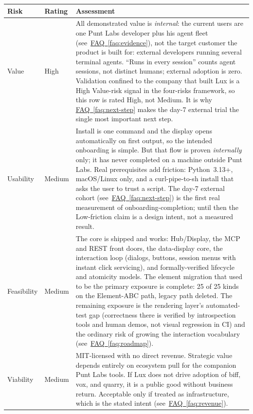 \documentclass[11pt,letterpaper]{article}
\newcommand{\faqref}[1]{\hyperref[#1]{FAQ~\ref*{#1}}}
\begin{document}
\renewcommand{\arraystretch}{1.6}
\begin{tabularx}{\textwidth}{@{} l l X @{}}
\toprule
\textbf{\color{SectionBlue}Risk} & \textbf{\color{SectionBlue}Rating} & \textbf{\color{SectionBlue}Assessment} \\
\midrule
Value      & \textcolor{RiskRed}{High} &
  All demonstrated value is \emph{internal}: the current users are one Punt Labs
  developer plus his agent fleet (see~\faqref{faq:evidence}), not the target
  customer the product is built for: external developers running several
  terminal agents. ``Runs in every session'' counts agent sessions, not distinct
  humans; external adoption is zero. Validation confined to the company that
  built Lux is a High Value-risk signal in the four-risks framework, so this row
  is rated High, not Medium. It is why \faqref{faq:next-step} makes the day-7
  external trial the single most important next step. \\
Usability  & \textcolor{RiskAmber}{Medium} &
  Install is one command and the display opens automatically on first output, so
  the intended onboarding is simple. But that flow is proven \emph{internally}
  only; it has never completed on a machine outside Punt Labs. Real prerequisites
  add friction: Python~3.13+, macOS/Linux only, and a curl-pipe-to-sh install
  that asks the user to trust a script. The day-7 external cohort
  (see~\faqref{faq:next-step}) is the first real measurement of
  onboarding-completion; until then the Low-friction claim is a design intent,
  not a measured result. \\
Feasibility & \textcolor{RiskAmber}{Medium} &
  The core is shipped and works: Hub/Display, the MCP and REST front doors, the
  data-display core, the interaction loop (dialogs, buttons, session menus with
  instant click servicing), and formally-verified lifecycle and atomicity
  models. The element migration that used to be the primary exposure is
  complete: 25 of 25 kinds on the Element-ABC path, legacy path deleted. The
  remaining exposure is the rendering layer's automated-test gap (correctness
  there is verified by introspection tools and human demos, not visual
  regression in CI) and the ordinary risk of growing the interaction
  vocabulary (see~\faqref{faq:roadmap}). \\
Viability  & \textcolor{RiskAmber}{Medium} &
  MIT-licensed with no direct revenue. Strategic value depends entirely on
  ecosystem pull for the companion Punt Labs tools. If Lux does not drive
  adoption of biff, vox, and quarry, it is a public good without business
  return. Acceptable only if treated as infrastructure, which is the stated
  intent (see~\faqref{faq:revenue}). \\
\bottomrule
\end{tabularx}
\renewcommand{\arraystretch}{1.0}
\end{document}
